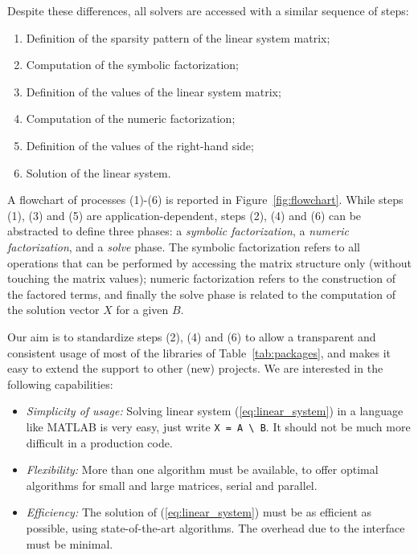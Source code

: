 \documentclass[acmtocl]{acmtrans2m}
\begin{document}
Despite these differences, all solvers are accessed with a similar sequence of
steps:
\begin{enumerate}
\item Definition of the sparsity pattern of the linear system matrix;
\item Computation of the symbolic factorization;
\item Definition of the values of the linear system matrix;
\item Computation of the numeric factorization;
\item Definition of the values of the right-hand side;
\item Solution of the linear system.
\end{enumerate}
A flowchart of processes (1)-(6) is reported in Figure~\ref{fig:flowchart}.
While steps (1), (3) and (5) are application-dependent, steps (2), (4) and
(6) can be abstracted to define three phases: a {\sl symbolic
factorization}, a {\sl numeric factorization}, and a {\sl solve} phase. The
symbolic factorization refers to all operations that can be performed by
accessing the matrix structure only (without touching the matrix values);
numeric factorization refers to the construction of the factored terms, and
finally the solve phase is related to the computation of the solution vector
$X$ for a given $B$.

Our aim is to standardize steps (2), (4)
and (6) to allow a transparent and consistent usage
of most of the libraries of Table~\ref{tab:packages}, and makes it easy
to extend the support to other (new) projects. We are interested in the
following capabilities:
\begin{itemize}

\item {\sl Simplicity of usage:} Solving linear system (\ref{eq:linear_system}) in a language
like MATLAB is very easy, just write \verb!X = A \ B!. It should not be much
more difficult in a production code.

\item {\sl Flexibility:} More than one algorithm must be available,
  to offer optimal algorithms for small and large matrices, serial and
  parallel.

\item {\sl Efficiency:} The solution of (\ref{eq:linear_system}) must be as
efficient as possible, using state-of-the-art algorithms. The
overhead due to the interface must be minimal.
\end{itemize}
\end{document}
